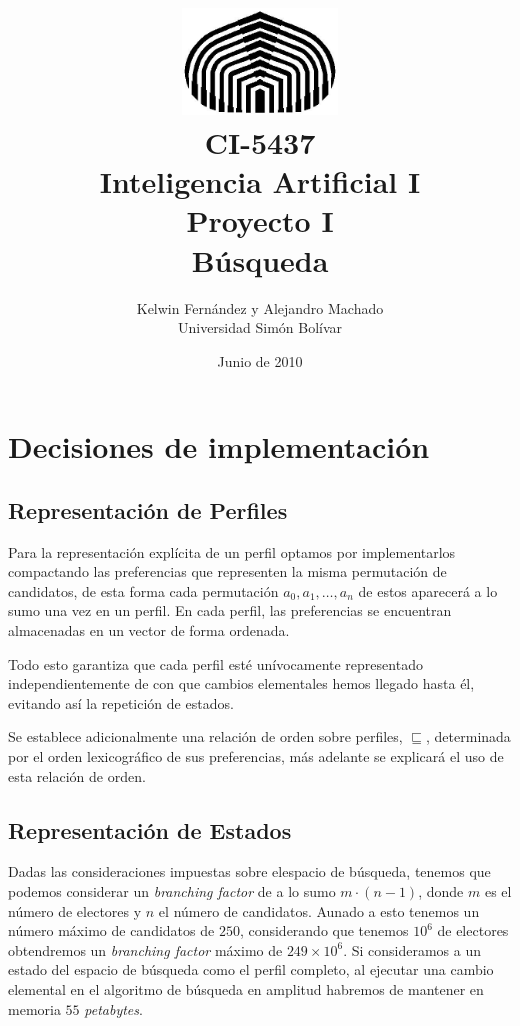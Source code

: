\documentclass[letterpaper,12pt, titlepage]{article}
\begin{document}
\title{	\includegraphics[height=80pt]{usb.jpg} \\
CI-5437 \\ Inteligencia Artificial I \\
Proyecto I\\
Búsqueda}
\author{Kelwin Fernández y Alejandro Machado\\
	Universidad Simón Bolívar} 
\date{Junio de 2010} 
\maketitle

\section{Decisiones de implementación}

\subsection{Representación de Perfiles}

Para la representación explícita de un perfil optamos por
implementarlos compactando las preferencias que representen
la misma permutación de candidatos, de esta forma cada permutación
$a_0, a_1, \ldots, a_n$ de estos aparecerá a lo sumo una vez
en un perfil. En cada perfil, las preferencias se encuentran
almacenadas en un vector de forma ordenada.

Todo esto garantiza que cada perfil esté unívocamente representado
independientemente de con que cambios elementales hemos llegado
hasta él, evitando así la repetición de estados.

\bigskip
Se establece adicionalmente una relación de orden sobre perfiles,
$\sqsubseteq$, determinada por el orden lexicográfico de sus
preferencias, más adelante se explicará el uso de esta relación
de orden.

\subsection{Representación de Estados}

Dadas las consideraciones impuestas sobre elespacio de búsqueda,
tenemos que podemos considerar un \textit{branching factor} de a
lo sumo $m\cdot(n-1)$, donde $m$ es el número de electores y $n$
el número de candidatos. Aunado a esto tenemos un número máximo
de candidatos de $250$, considerando que tenemos $10^6$ de electores
obtendremos un \textit{branching factor} máximo de $249\times 10^6$.
Si consideramos a un estado del espacio de búsqueda como el perfil
completo, al ejecutar una cambio elemental en el algoritmo de
búsqueda en amplitud habremos de mantener en memoria $55$
\textit{petabytes}.
\end{document}
